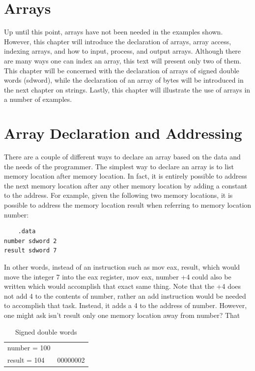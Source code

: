 \documentclass[10pt]{book}
\begin{document}
\section{Arrays}
Up until this point, arrays have not been needed in the examples shown. However, this chapter will introduce the declaration of arrays, array access, indexing arrays, and how to input, process, and output arrays. Although there are many ways one can index an array, this text will present only two of them. This chapter will be concerned with the declaration of arrays of signed double words (sdword), while the declaration of an array of bytes will be introduced in the next chapter on strings. Lastly, this chapter will illustrate the use of arrays in a number of examples.

\section{Array Declaration and Addressing}
There are a couple of different ways to declare an array based on the data and the needs of the programmer. The simplest way to declare an array is to list memory location after memory location. In fact, it is entirely possible to address the next memory location after any other memory location by adding a constant to the address. For example, given the following two memory locations, it is possible to address the memory location result when referring to memory location number:

\begin{verbatim}
    .data
number sdword 2
result sdword 7
\end{verbatim}

In other words, instead of an instruction such as mov eax, result, which would move the integer 7 into the eax register, mov eax, number +4 could also be written which would accomplish that exact same thing. Note that the +4 does not add 4 to the contents of number, rather an add instruction would be needed to accomplish that task. Instead, it adds a 4 to the address of number. However, one might ask isn't result only one memory location away from number? That

\begin{table}[h]
\centering
\begin{tabular}{ll}
\hline
number = 100 &  \\
result = 104 & 00000002 \\
\hline
\end{tabular}
\caption{Signed double words}
\end{table}
\end{document}
